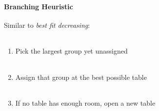 \documentclass{beamer}
\newcommand{\AutoSectionTitle}{}
\begin{document}


\begin{frame}
  \frametitle{\AutoSectionTitle}
  
  \begin{center}
    
  \end{center}
  
\end{frame}




\begin{frame}
  \frametitle{\AutoSectionTitle}
  
  \begin{center}
    
  \end{center}
  
\end{frame}




\begin{frame}
  \frametitle{\AutoSectionTitle}
  
  \begin{center}
    
  \end{center}
  
\end{frame}




\begin{frame}
  \frametitle{\AutoSectionTitle}
  \framesubtitle{Branching Heuristic}
  
  Similar to \emph{best fit decreasing}: \\~\\

  \pause

  \begin{enumerate}
  \item Pick the largest group yet unassigned \\~\\
    
    \pause
    
  \item Assign that group at the best possible table \\~\\
    
    \pause
    
  \item If no table has enough room, open a new table
  \end{enumerate}
  
\end{frame}
\end{document}

